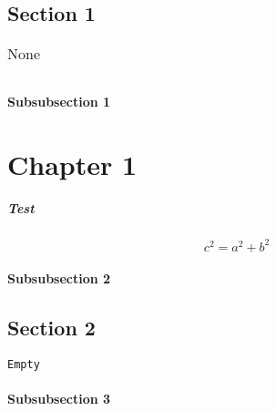 

\section{Section 1}

\begin{verse}
\end{verse}

\begin{table}%
\begin{tabular}{lcr}

\end{tabular}
\caption{None}
\label{tbl:Test}
\end{table}

\subsubsection{Subsubsection 1}

\chapter{Chapter 1}

\paragraph{Test}

\begin{equation}
c^2=a^2+b^2
\label{eq:Pythagoras}
\end{equation}

\subsubsection{Subsubsection 2}

\section{Section 2}

\begin{verbatim}
Empty
\end{verbatim}


\subsubsection{Subsubsection 3}

